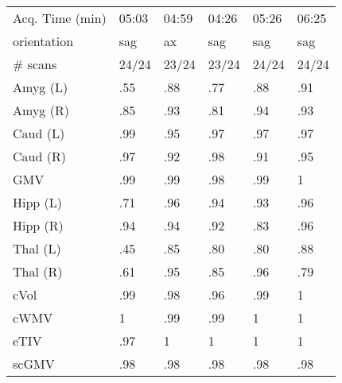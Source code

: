 \documentclass{article}
\begin{document}
\begin{table}
\begin{tabular}{llllll}
Acq. Time (min)       &           05:03 &           04:59 &           04:26 &           05:26 &           06:25 \\
orientation           &                sag &                 ax &                sag &                sag &                sag \\
\# scans & 24/24 & 23/24 & 23/24 & 24/24 & 24/24 \\
\midrule
Amyg (L)              &               .55 &               .88 &               .77 &               .88 &               .91 \\
Amyg (R)              &               .85 &               .93 &               .81 &               .94 &               .93 \\
Caud (L)              &               .99 &               .95 &               .97 &               .97 &               .97 \\
Caud (R)              &               .97 &               .92 &               .98 &               .91 &               .95 \\
GMV                   &               .99 &               .99 &               .98 &               .99 &               1   \\
Hipp (L)              &               .71 &               .96 &               .94 &               .93 &               .96 \\
Hipp (R)              &               .94 &               .94 &               .92 &               .83 &               .96 \\
Thal (L)              &               .45 &               .85 &               .80 &               .80 &               .88 \\
Thal (R)              &               .61 &               .95 &               .85 &               .96 &               .79 \\
cVol                  &               .99 &               .98 &               .96 &               .99 &               1   \\
cWMV                  &               1   &               .99 &               .99 &               1   &               1   \\
eTIV                  &               .97 &               1   &               1   &               1   &               1   \\
scGMV                 &               .98 &               .98 &               .98 &               .98 &               .98 \\
\bottomrule
\end{tabular}

\end{table}
\end{document}
